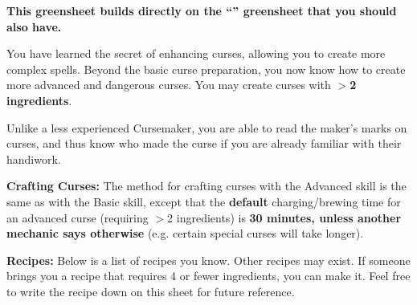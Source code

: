 \documentclass[green]{GL2020}
\begin{document}
\name{\gCursemakingAdvanced{}}

\textbf{This greensheet builds directly on the ``\gCursemakingBasic{}'' greensheet that you should also have.}

You have learned the secret of enhancing curses, allowing you to create more complex spells. Beyond the basic curse preparation, you now know how to create more advanced and dangerous curses. You may create curses with \textbf{ $>$2 ingredients}.

Unlike a less experienced Cursemaker, you are able to read the maker’s marks on curses, and thus know who made the curse if you are already familiar with their handiwork.

\textbf{Crafting Curses:}
The method for crafting curses with the Advanced skill is the same as with the Basic skill, except that the \textbf{default} charging/brewing time for an advanced curse (requiring $>$2 ingredients) is \textbf{30 minutes, unless another mechanic says otherwise} (e.g. certain special curses will take longer).

\textbf{Recipes:}
Below is a list of recipes you know. Other recipes may exist. If someone brings you a recipe that requires 4 or fewer ingredients, you can make it. Feel free to write the recipe down on this sheet for future reference.
\end{document}
